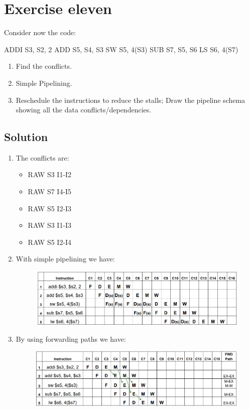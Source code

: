 \section{Exercise eleven}

Consider now the code:
\begin{verbnobox}[\verbarg]
ADDI S3, S2, 2
ADD S5, S4, S3
SW S5, 4(S3)
SUB S7, S5, S6
LS S6, 4(S7)
\end{verbnobox}
\begin{enumerate}
    \item Find the conflicts. 
    \item Simple Pipelining. 
    \item Reschedule the instructions to reduce the stalls; Draw the pipeline schema showing all the data conflicts/dependencies.
\end{enumerate}

\subsection*{Solution}
\begin{enumerate}
    \item The conflicts are: 
        \begin{itemize}
            \item RAW S3 I1-I2
            \item RAW S7 I4-I5
            \item RAW S5 I2-I3
            \item RAW S3 I1-I3
            \item RAW S5 I2-I4
        \end{itemize}
    \item With simple pipelining we have: 
        \begin{figure}[H]
            \centering
            \includegraphics[width=1\linewidth]{images/simp.png}
        \end{figure}
    \item By using forwarding paths we have: 
        \begin{figure}[H]
            \centering
            \includegraphics[width=1\linewidth]{images/simp1.png}
        \end{figure}
\end{enumerate}

